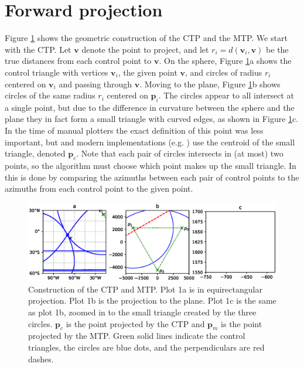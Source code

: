 \documentclass[]{interact}
\begin{document}
\section{Forward projection}
Figure \ref{fig:chamberlin} shows the geometric construction of the CTP and the
MTP. We start with the CTP. Let $\mathbf v$ denote the point to project, and
let $r_i = d(\mathbf v_i, \mathbf v)$ be the true distances from each control
point to $\mathbf v$. On the sphere, Figure \ref{fig:chamberlin}a shows the
control triangle with vertices $\mathbf v_i$, the given point $\mathbf v$, and
circles of radius $r_i$ centered on $\mathbf v_i$ and passing through
$\mathbf v$. Moving to the plane, Figure \ref{fig:chamberlin}b shows circles of
the same radius $r_i$ centered on $\mathbf p_i$. The circles appear to all
intersect at a single point, but due to the difference in curvature between the
sphere and the plane they in fact form a small triangle with curved edges, as
shown in Figure \ref{fig:chamberlin}c. In the time of manual plotters the exact
definition of this point was less important, but \citet{christensen} and modern
implementations (e.g. \citealp{proj}) use the centroid of the small triangle,
denoted $\mathbf p_c$.
Note that each pair of circles intersects in (at most) two points,
so the algorithm must choose which point makes up the small triangle.
In \citet{christensen} this is done by comparing the azimuths between each pair
of control points to the azimuths from each control point to the given point.

\begin{figure}
  \includegraphics[width=\textwidth]{construction}
  \caption{Construction of the CTP and MTP. Plot 1a is in equirectangular
  projection. Plot 1b is the projection to the plane. Plot 1c is the same as
  plot 1b, zoomed in to the small triangle created by the three circles.
  $\mathbf p_c$ is the point projected by the CTP and $\mathbf p_m$ is the
  point projected by the MTP. Green solid lines indicate the control
  triangles, the circles are blue dots, and the perpendiculars are red dashes.}
  \label{fig:chamberlin}
\end{figure}
\end{document}
